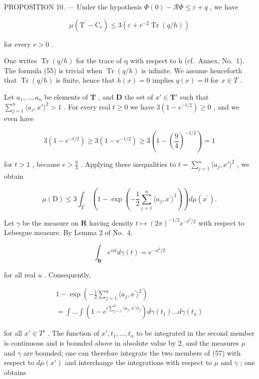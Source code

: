 PROPOSITION 10. --- Under the hypothesis \(\Phi(0) - \mathcal{R}\Phi \leqslant \varepsilon + q\) , we have

\[
\mu (\mathrm{T} ^ {\prime} - \mathrm{C} _ {r}) \leqslant 3 \left(\varepsilon + r ^ {- 2} \operatorname{Tr} (q / h)\right)\tag{55}
\]

for every \(r > 0\) .

One writes \(\operatorname{Tr}(q/h)\) for the trace of q with respect to h (cf.~Annex, No.~1). The formula (55) is trivial when \(\operatorname{Tr}(q/h)\) is infinite. We assume henceforth that \(\operatorname{Tr}(q/h)\) is finite, hence that \(h(x)=0\) implies \(q(x)=0\) for \(x\in T\) .

Let \(a_1, \ldots, a_n\) be elements of \(\mathbf{T}\) , and \(\mathbf{D}\) the set of \(x' \in \mathbf{T}'\) such that \(\sum_{j=1}^{n} \langle a_j, x' \rangle^2 > 1\) . For every real \(t \geqslant 0\) we have \(3(1 - e^{-t/2}) \geqslant 0\) , and we even have

\[
3 (1 - e ^ {- t / 2}) \geqslant 3 (1 - e ^ {- 1 / 2}) \geqslant 3 \left(1 - \left(\frac {9}{4}\right) ^ {- 1 / 2}\right) = 1
\]

for \(t > 1\) , because \(e > \frac{9}{4}\) . Applying these inequalities to \(t = \sum_{j=1}^{n} \langle a_j, x' \rangle^2\) , we obtain

\[
\mu (\mathrm{D}) \leqslant 3 \int_ {\mathrm{T} ^ {\prime}} \left(1 - \exp \left(- \frac {1}{2} \sum_ {j = 1} ^ {n} \langle a _ {j}, x ^ {\prime} \rangle^ {2}\right)\right) d \mu (x ^ {\prime}).\tag{56}
\]

Let \(\gamma\) be the measure on \(\mathbf{R}\) having density \(t \mapsto (2\pi)^{-1/2} e^{-t^2/2}\) with respect to Lebesgue measure. By Lemma 2 of No.~4,

\[
\int_ {\mathbf {R}} e ^ {i u t} d \gamma (t) = e ^ {- u ^ {2} / 2}
\]

for all real \(u\) . Consequently,

\[
\begin{array}{l} 1 - \exp \left(- \frac {1}{2} \sum_ {j = 1} ^ {n} \langle a _ {j}, x ^ {\prime} \rangle^ {2}\right) \\ = \int \dots \int \left(1 - e ^ {i \sum_ {j = 1} ^ {n} \langle a _ {j}, x ^ {\prime} \rangle t _ {j}}\right) d \gamma (t _ {1}) \dots d \gamma (t _ {n}) \end{array}\tag{57}
\]

for all \(x' \in T'\) . The function of \(x', t_{1}, \ldots, t_{n}\) to be integrated in the second member is continuous and is bounded above in absolute value by 2, and the measures \(\mu\) and \(\gamma\) are bounded; one can therefore integrate the two members of (57) with respect to \(d\mu(x')\) and interchange the integrations with respect to \(\mu\) and \(\gamma\) ; one obtains

